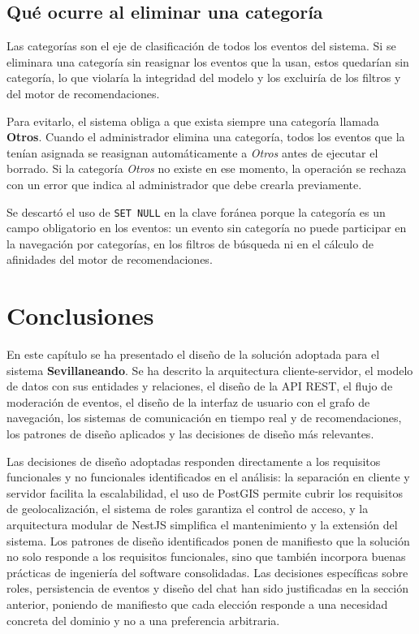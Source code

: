 \subsection{Qué ocurre al eliminar una categoría}

Las categorías son el eje de clasificación de todos los eventos del sistema. Si se eliminara una categoría sin reasignar los eventos que la usan, estos quedarían sin categoría, lo que violaría la integridad del modelo y los excluiría de los filtros y del motor de recomendaciones.

Para evitarlo, el sistema obliga a que exista siempre una categoría llamada \textbf{Otros}. Cuando el administrador elimina una categoría, todos los eventos que la tenían asignada se reasignan automáticamente a \emph{Otros} antes de ejecutar el borrado. Si la categoría \emph{Otros} no existe en ese momento, la operación se rechaza con un error que indica al administrador que debe crearla previamente.

Se descartó el uso de \texttt{SET NULL} en la clave foránea porque la categoría es un campo obligatorio en los eventos: un evento sin categoría no puede participar en la navegación por categorías, en los filtros de búsqueda ni en el cálculo de afinidades del motor de recomendaciones.

\section{Conclusiones}

En este capítulo se ha presentado el diseño de la solución adoptada para el sistema \textbf{Sevillaneando}. Se ha descrito la arquitectura cliente-servidor, el modelo de datos con sus entidades y relaciones, el diseño de la API REST, el flujo de moderación de eventos, el diseño de la interfaz de usuario con el grafo de navegación, los sistemas de comunicación en tiempo real y de recomendaciones, los patrones de diseño aplicados y las decisiones de diseño más relevantes.

Las decisiones de diseño adoptadas responden directamente a los requisitos funcionales y no funcionales identificados en el análisis: la separación en cliente y servidor facilita la escalabilidad, el uso de PostGIS permite cubrir los requisitos de geolocalización, el sistema de roles garantiza el control de acceso, y la arquitectura modular de NestJS simplifica el mantenimiento y la extensión del sistema. Los patrones de diseño identificados ponen de manifiesto que la solución no solo responde a los requisitos funcionales, sino que también incorpora buenas prácticas de ingeniería del software consolidadas. Las decisiones específicas sobre roles, persistencia de eventos y diseño del chat han sido justificadas en la sección anterior, poniendo de manifiesto que cada elección responde a una necesidad concreta del dominio y no a una preferencia arbitraria.
